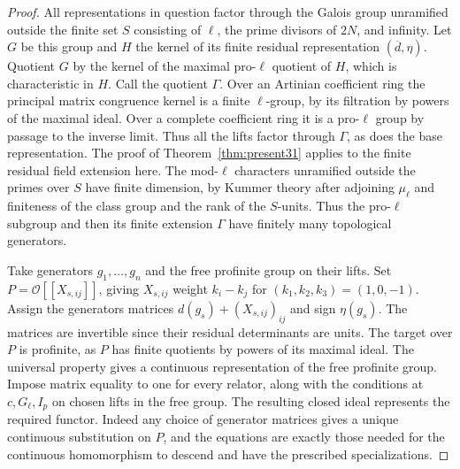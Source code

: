 \documentclass[a4paper,11pt]{article}
\theoremstyle{definition}
\theoremstyle{remark}
\numberwithin{equation}{section}
\newcommand{\OO}{\mathcal O}
\begin{document}
\begin{proof}
All representations in question factor through the Galois group unramified outside the finite set \(S\) consisting of \(\ell\), the prime divisors of \(2N\), and infinity. Let \(G\) be this group and \(H\) the kernel of its finite residual representation \((\overline d,\eta)\). Quotient \(G\) by the kernel of the maximal pro-\(\ell\) quotient of \(H\), which is characteristic in \(H\). Call the quotient \(\Gamma\). Over an Artinian coefficient ring the principal matrix congruence kernel is a finite \(\ell\)-group, by its filtration by powers of the maximal ideal. Over a complete coefficient ring it is a pro-\(\ell\) group by passage to the inverse limit. Thus all the lifts factor through \(\Gamma\), as does the base representation. The proof of Theorem~\ref{thm:present31} applies to the finite residual field extension here. The mod-\(\ell\) characters unramified outside the primes over \(S\) have finite dimension, by Kummer theory after adjoining \(\mu_\ell\) and finiteness of the class group and the rank of the \(S\)-units. Thus the pro-\(\ell\) subgroup and then its finite extension \(\Gamma\) have finitely many topological generators.

Take generators \(g_1,\ldots,g_n\) and the free profinite group on their lifts. Set \(P=\OO[[X_{s,ij}]]\), giving \(X_{s,ij}\) weight \(k_i-k_j\) for \((k_1,k_2,k_3)=(1,0,-1)\). Assign the generators matrices \(d(g_s)+(X_{s,ij})_{ij}\) and sign \(\eta(g_s)\). The matrices are invertible since their residual determinants are units. The target over \(P\) is profinite, as \(P\) has finite quotients by powers of its maximal ideal. The universal property gives a continuous representation of the free profinite group. Impose matrix equality to one for every relator, along with the conditions at \(c,G_\ell,I_p\) on chosen lifts in the free group. The resulting closed ideal represents the required functor. Indeed any choice of generator matrices gives a unique continuous substitution on \(P\), and the equations are exactly those needed for the continuous homomorphism to descend and have the prescribed specializations.


\end{proof}
\end{document}
